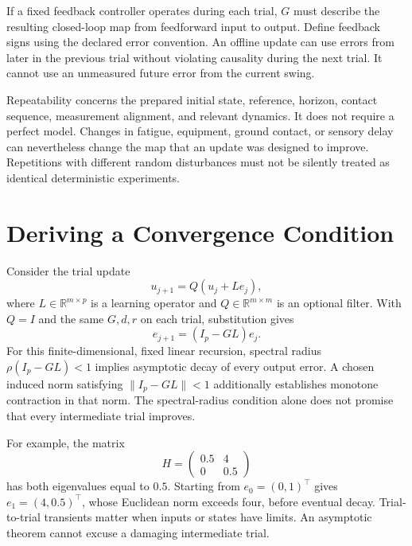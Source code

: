 If a fixed feedback controller operates during each trial, $G$ must describe the resulting closed-loop map from feedforward input to output. Define feedback signs using the declared error convention. An offline update can use errors from later in the previous trial without violating causality during the next trial. It cannot use an unmeasured future error from the current swing.

Repeatability concerns the prepared initial state, reference, horizon, contact sequence, measurement alignment, and relevant dynamics. It does not require a perfect model. Changes in fatigue, equipment, ground contact, or sensory delay can nevertheless change the map that an update was designed to improve. Repetitions with different random disturbances must not be silently treated as identical deterministic experiments.

\section{Deriving a Convergence Condition}

Consider the trial update
\begin{equation}
u_{j+1}=Q(u_j+L e_j),
\end{equation}
where $L\in\mathbb R^{m\times p}$ is a learning operator and $Q\in\mathbb R^{m\times m}$ is an optional filter. With $Q=I$ and the same $G,d,r$ on each trial, substitution gives
\begin{equation}
e_{j+1}=(I_p-GL)e_j .
\end{equation}
For this finite-dimensional, fixed linear recursion, spectral radius $\rho(I_p-GL)<1$ implies asymptotic decay of every output error. A chosen induced norm satisfying $\|I_p-GL\|<1$ additionally establishes monotone contraction in that norm. The spectral-radius condition alone does not promise that every intermediate trial improves.

For example, the matrix
\begin{equation}
H=\begin{pmatrix}0.5&4\\0&0.5\end{pmatrix}
\end{equation}
has both eigenvalues equal to $0.5$. Starting from $e_0=(0,1)^\top$ gives $e_1=(4,0.5)^\top$, whose Euclidean norm exceeds four, before eventual decay. Trial-to-trial transients matter when inputs or states have limits. An asymptotic theorem cannot excuse a damaging intermediate trial.

